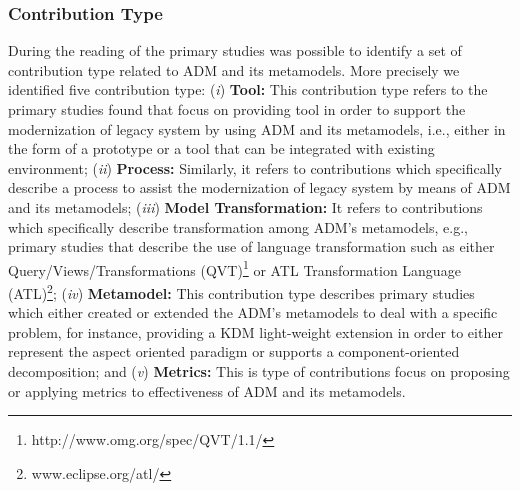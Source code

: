 

\subsubsection{Contribution Type}


During the reading of the primary studies was possible to identify a set of contribution type related to ADM and its metamodels. More precisely we identified five contribution type: (\textit{i}) \textbf{Tool:} This contribution type refers to the primary studies found that focus on providing tool in order to support the modernization of legacy system by using ADM and its metamodels, i.e., either in the form of a prototype or a tool that can be integrated with existing environment; (\textit{ii}) \textbf{Process:} Similarly, it refers to contributions which specifically describe a process to assist the modernization of legacy system by means of ADM and its metamodels; (\textit{iii}) \textbf{Model Transformation:} It refers to contributions which specifically describe transformation among ADM's metamodels, e.g., primary studies that describe the use of language transformation such as either Query/Views/Transformations (QVT)\footnote{http://www.omg.org/spec/QVT/1.1/} or ATL Transformation Language (ATL)\footnote{www.eclipse.org/atl/}; (\textit{iv}) \textbf{Metamodel:} This contribution type describes primary studies which either created or extended the ADM's metamodels to deal with a specific problem, for instance, providing a KDM light-weight extension in order to either represent the aspect oriented paradigm or supports a component-oriented decomposition; and (\textit{v}) \textbf{Metrics:} This is type of contributions focus on proposing or applying metrics to effectiveness of ADM and its metamodels.






